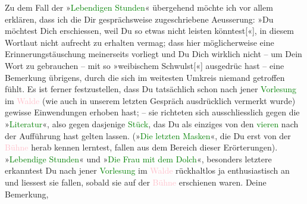 \pstart
           Zu dem Fall der »\textcolor{green}{Lebendigen Stunden}{}\ledrightnote{\textcolor{green}{Lebendige Stunden. Vier Einakter}}« übergehend
               möchte ich vor allem erklären, dass ich die Dir ge{\pb}sprächsweise zugeschriebene
               Aeusserung: »Du möchtest Dich erschiessen, weil Du so etwas nicht leisten
                  könntest{[}«{]}, in diesem Wortlaut nicht aufrecht zu erhalten
               vermag; dass hier möglicherweise eine Erinnerungstäuschung meinerseits vorliegt und
               Du Dich wirklich nicht – um Dein Wort zu gebrauchen – mit so »weibischem
                  Schwulst{[}«{]} ausgedrüc hast – eine Bemerkung übrigens, durch die sich im weitesten Umkreis niemand
               getroffen fühlt. Es ist ferner festzustellen, dass Du tatsächlich schon nach jener
                  \textcolor{green}{Vorlesung}{}\ledrightnote{{$\rightarrow$}\textcolor{green}{Lebendige Stunden. Vier Einakter}} im \textcolor{pink}{Walde}{}\ledrightnote{{$\rightarrow$}\textcolor{pink}{Welsberg-Taisten}} (wie auch in unserem
               letzten Gespräch ausdrücklich vermerkt wurde) gewisse Einwendungen erhoben hast; –
               sie richteten sich ausschliesslich gegen die »\textcolor{green}{Literatur}{}\ledrightnote{\textcolor{green}{Literatur}}«, also gegen dasjenige \textcolor{green}{Stück}{}\ledrightnote{{$\rightarrow$}\textcolor{green}{Literatur}}, das Du als einziges von den \textcolor{green}{vieren}{}\ledrightnote{{$\rightarrow$}\textcolor{green}{Lebendige Stunden. Vier Einakter}} nach der Aufführung hast gelten
               lassen. (»\textcolor{green}{Die letzten Masken}{}\ledrightnote{\textcolor{green}{Die letzten Masken}}«, die Du erst von
               der \textcolor{pink}{Bühne}{}\ledrightnote{{$\rightarrow$}\textcolor{pink}{Deutsches Theater Berlin}} herab kennen lerntest,
               fallen aus dem Bereich dieser Erörterungen). »\textcolor{green}{Lebendige Stunden}{}\ledrightnote{\textcolor{green}{Lebendige Stunden}}« und »\textcolor{green}{Die Frau mit dem
                  Dolch}{}\ledrightnote{\textcolor{green}{Die Frau mit dem Dolche}}«, besonders letztere erkanntest Du nach jener \textcolor{green}{Vorlesung}{}\ledrightnote{{$\rightarrow$}\textcolor{green}{Lebendige Stunden. Vier Einakter}} im \textcolor{pink}{Walde}{}\ledrightnote{{$\rightarrow$}\textcolor{pink}{Welsberg-Taisten}} rückhaltlos ja enthusiastisch an und
               liessest sie fallen, sobald sie auf der \textcolor{pink}{Bühne}{}\ledrightnote{{$\rightarrow$}\textcolor{pink}{Deutsches Theater Berlin}} erschienen war\introOben{}en\introOben{}. Deine Bemerkung,
